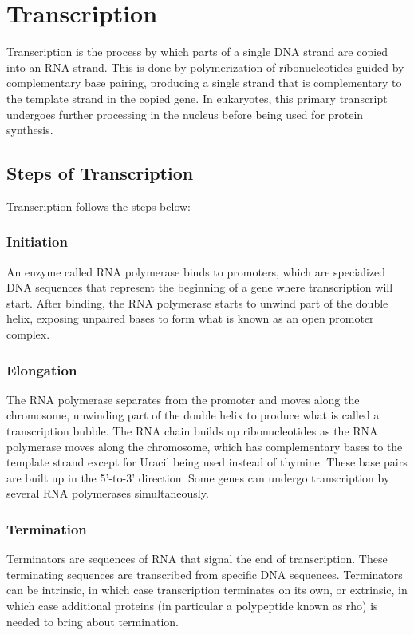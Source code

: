 \documentclass[12pt,titlepage]{article}
\begin{document}
  \newpage

  \section{Transcription}
    Transcription is the process by which parts of a single DNA strand are copied into an RNA strand. This is done by polymerization of ribonucleotides guided by
    complementary base pairing, producing a single strand that is complementary to the template strand in the copied gene. In eukaryotes, this primary transcript
    undergoes further processing in the nucleus before being used for protein synthesis.

    \subsection{Steps of Transcription}
      Transcription follows the steps below:

      \subsubsection{Initiation}
        An enzyme called RNA polymerase binds to promoters, which are specialized DNA sequences that represent the beginning of a gene where transcription will start.
        After binding, the RNA polymerase starts to unwind part of the double helix, exposing unpaired bases to form what is known as an open promoter complex.

      \subsubsection{Elongation}
        The RNA polymerase separates from the promoter and moves along the chromosome, unwinding part of the double helix to produce what is called a transcription
        bubble. The RNA chain builds up ribonucleotides as the RNA polymerase moves along the chromosome, which has complementary bases to the template strand except
        for Uracil being used instead of thymine. These base pairs are built up in the 5'-to-3' direction. Some genes can undergo transcription by several RNA
        polymerases simultaneously.

      \subsubsection{Termination}
        Terminators are sequences of RNA that signal the end of transcription. These terminating sequences are transcribed from specific DNA sequences.
        Terminators can be intrinsic, in which case transcription terminates on its own, or extrinsic, in which case additional proteins (in particular a
        polypeptide known as rho) is needed to bring about termination.
\end{document}

